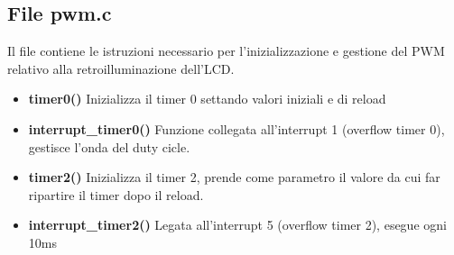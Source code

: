 \documentclass[11pt]{article}
\begin{document}
\subsection*{File pwm.c}
Il file contiene le istruzioni necessario per l'inizializzazione e gestione del PWM relativo alla retroilluminazione dell'LCD.
\begin{itemize}
\item \textbf{timer0()} Inizializza il timer 0 settando valori iniziali e di reload
\item \textbf{interrupt\_timer0()} Funzione collegata all'interrupt 1 (overflow timer 0), gestisce l'onda del duty cicle.
\item \textbf{timer2()} Inizializza il timer 2, prende come parametro il valore da cui far ripartire il timer dopo il reload.
\item \textbf{interrupt_timer2()} Legata all'interrupt 5 (overflow timer 2), esegue ogni 10ms 
\end{itemize}
\end{document}
